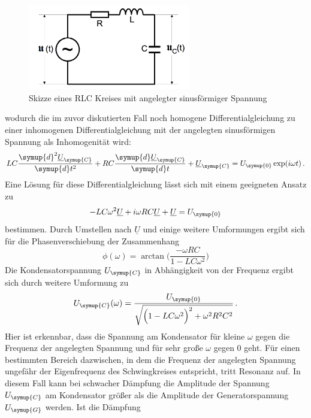 \begin{figure}
  \centering
  \includegraphics[width=200pt]{data/angeregter_schwingkreis_theorie.png}
  \caption{Skizze eines RLC Kreises mit angelegter sinusförmiger Spannung
  \cite{Versuchsanleitung1}}
  \label{fig:RLC_sinus}
\end{figure}
wodurch die im zuvor diskutierten Fall noch homogene Differentialgleichung zu einer
inhomogenen Differentialgleichung mit der angelegten sinusförmigen Spannung
als Inhomogenität wird:
\begin{equation}
  LC\frac{\symup{d}^2\underline{U}_{\symup{C}}}{\symup{d}t^2}
  +RC\frac{\symup{d}\underline{U}_{\symup{C}}}{\symup{d}t}
  +\underline{U}_{\symup{C}} = U_{\symup{0}}\exp(i\omega t) \,.
\end{equation}
Eine Lösung für diese Differentialgleichung lässt sich mit einem geeigneten Ansatz
zu
\begin{equation}
  -LC\omega^2\underline{U}+i\omega R C\underline{U}+\underline{U}=U_{\symup{0}}
\end{equation}
bestimmen. Durch Umstellen nach $\underline{U}$ und einige weitere Umformungen ergibt
sich für die Phasenverschiebung der Zusammenhang
\begin{equation}
  \phi(\omega)=\arctan\biggl(\frac{-\omega R C}{1-L C \omega^2}\biggr)
  \label{eqn:phase}
\end{equation}
Die Kondensatorspannung $U_{\symup{C}}$ in Abhängigkeit von der Frequenz ergibt sich
durch weitere Umformung zu
\begin{equation}
  U_{\symup{C}}(\omega)=\frac{U_{\symup{0}}}{\sqrt{\Bigl(1-LC\omega^2\Bigr)^2+\omega^2 R^2 C^2}} \,.
\end{equation}
Hier ist erkennbar, dass die Spannung am Kondensator für kleine $\omega$ gegen
die Frequenz der angelegten Spannung und für sehr große $\omega$ gegen $0$ geht.
Für einen bestimmten Bereich dazwischen, in dem die Frequenz der angelegten Spannung
ungefähr der Eigenfrequenz des Schwingkreises entspricht, tritt Resonanz auf. In
diesem Fall kann bei schwacher Dämpfung die Amplitude der Spannung $U_{\symup{C}}$ am Kondensator größer
als die Amplitude der Generatorspannung $U_{\symup{G}}$ werden. Ist die Dämpfung
